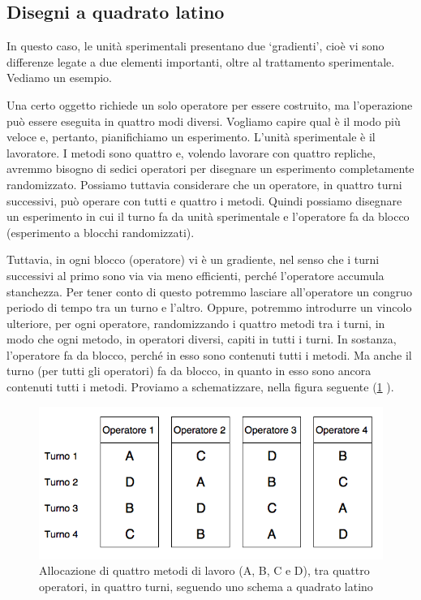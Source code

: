 \documentclass[a4paper,12pt,oneside]{book}
\begin{document}
\hypertarget{disegni-a-quadrato-latino}{%
\subsection{Disegni a quadrato latino}\label{disegni-a-quadrato-latino}}

In questo caso, le unità sperimentali presentano due `gradienti', cioè vi sono differenze legate a due elementi importanti, oltre al trattamento sperimentale. Vediamo un esempio.

Una certo oggetto richiede un solo operatore per essere costruito, ma l'operazione può essere eseguita in quattro modi diversi. Vogliamo capire qual è il modo più veloce e, pertanto, pianifichiamo un esperimento. L'unità sperimentale è il lavoratore. I metodi sono quattro e, volendo lavorare con quattro repliche, avremmo bisogno di sedici operatori per disegnare un esperimento completamente randomizzato. Possiamo tuttavia considerare che un operatore, in quattro turni successivi, può operare con tutti e quattro i metodi. Quindi possiamo disegnare un esperimento in cui il turno fa da unità sperimentale e l'operatore fa da blocco (esperimento a blocchi randomizzati).

Tuttavia, in ogni blocco (operatore) vi è un gradiente, nel senso che i turni successivi al primo sono via via meno efficienti, perché l'operatore accumula stanchezza. Per tener conto di questo potremmo lasciare all'operatore un congruo periodo di tempo tra un turno e l'altro. Oppure, potremmo introdurre un vincolo ulteriore, per ogni operatore, randomizzando i quattro metodi tra i turni, in modo che ogni metodo, in operatori diversi, capiti in tutti i turni. In sostanza, l'operatore fa da blocco, perché in esso sono contenuti tutti i metodi. Ma anche il turno (per tutti gli operatori) fa da blocco, in quanto in esso sono ancora contenuti tutti i metodi. Proviamo a schematizzare, nella figura seguente (\ref{fig:figName391} ).

\begin{figure}

{\centering \includegraphics[width=0.9\linewidth]{_images/TurniOperatori} 

}

\caption{Allocazione di quattro metodi di lavoro (A, B, C e D), tra quattro operatori, in quattro turni, seguendo uno schema a quadrato latino}\label{fig:figName391}
\end{figure}
\end{document}

